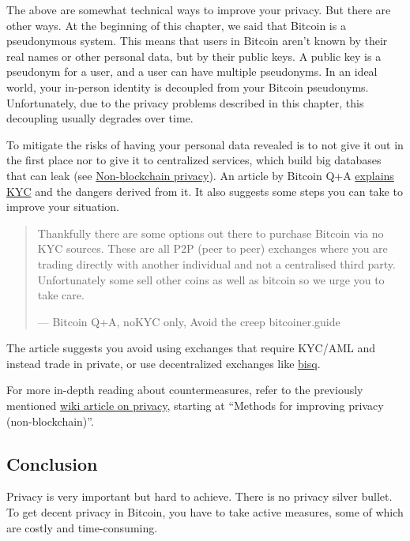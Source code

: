 The above are somewhat technical ways to improve your privacy. But there
are other ways. At the beginning of this chapter, we said that Bitcoin
is a pseudonymous system. This means that users in Bitcoin aren't known
by their real names or other personal data, but by their public keys. A
public key is a pseudonym for a user, and a user can have multiple
pseudonyms. In an ideal world, your in-person identity is decoupled from
your Bitcoin pseudonyms. Unfortunately, due to the privacy problems
described in this chapter, this decoupling usually degrades over time.

To mitigate the risks of having your personal data revealed is to not
give it out in the first place nor to give it to centralized services,
which build big databases that can leak (see
\protect\hyperlink{nonblockchainprivacy}{Non-blockchain privacy}). An
article by Bitcoin Q+A
\href{https://bitcoiner.guide/nokyconly/}{explains KYC} and the dangers
derived from it. It also suggests some steps you can take to improve
your situation.

\begin{quote}
Thankfully there are some options out there to purchase Bitcoin via no
KYC sources. These are all P2P (peer to peer) exchanges where you are
trading directly with another individual and not a centralised third
party. Unfortunately some sell other coins as well as bitcoin so we urge
you to take care.

---  Bitcoin Q+A, noKYC only, Avoid the creep bitcoiner.guide
\end{quote}

The article suggests you avoid using exchanges that require KYC/AML and
instead trade in private, or use decentralized exchanges like
\href{https://bisq.network/}{bisq}.

For more in-depth reading about countermeasures, refer to the previously
mentioned
\href{https://en.bitcoin.it/wiki/Privacy\#Methods_for_improving_privacy_.28non-blockchain.29}{wiki
article on privacy}, starting at ``Methods for improving privacy
(non-blockchain)''.

\hypertarget{_conclusion}{%
\subsection{Conclusion}\label{_conclusion}}

Privacy is very important but hard to achieve. There is no privacy
silver bullet. To get decent privacy in Bitcoin, you have to take active
measures, some of which are costly and time-consuming.


